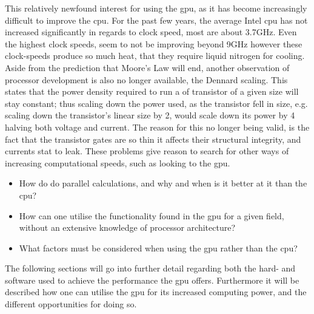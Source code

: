This relatively newfound interest for using the \acrshort{gpu}, as it has become increasingly difficult to improve the \acrshort{cpu}.
For the past few years, the average Intel \acrshort{cpu} has not increased significantly in regards to clock speed, most are about 3.7GHz.
Even the highest clock speeds, seem to not be improving beyond 9GHz however these clock-speeds produce so much heat, that they require liquid nitrogen for cooling.
Aside from the prediction that Moore's Law will end, another observation of processor development is also no longer available, the Dennard scaling.
This states that the power density required to run a of transistor of a given size will stay constant; thus scaling down the power used, as the transistor fell in size, e.g. scaling down the transistor's linear size by 2, would scale down its power by 4 halving both voltage and current.\citep{DennardScaling}
The reason for this no longer being valid, is the fact that the transistor gates are so thin it affects their structural integrity, and currents stat to leak.\citep{CPUClockSpeeds}
These problems give reason to search for other ways of increasing computational speeds, such as looking to the \acrshort{gpu}.


\begin{itemize}
	\item How do  do parallel calculations, and why and when is it better at it than the \acrshort{cpu}?
	\item How can one utilise the functionality found in the \acrshort{gpu} for a given field, without an extensive knowledge of processor architecture?
	\item What factors must be considered when using the \acrshort{gpu} rather than the \acrshort{cpu}? 
\end{itemize}

The following sections will go into further detail regarding both the hard- and software used to achieve the performance the \acrshort{gpu} offers.
Furthermore it will be described how one can utilise the \acrshort{gpu} for its increased computing power, and the different opportunities for doing so. 

\newpage


